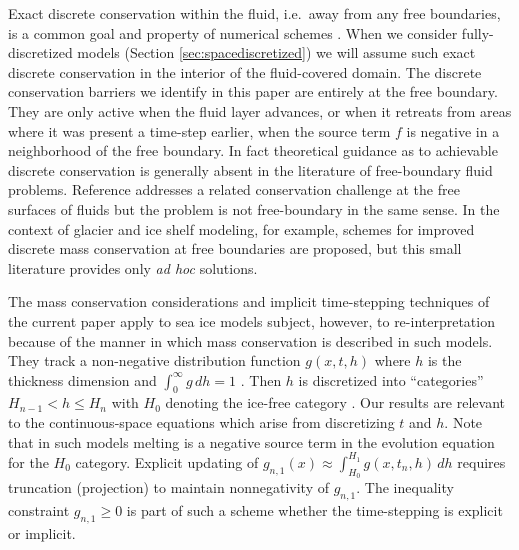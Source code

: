 \documentclass[final,onefignum]{siamart190516}
\begin{document}
Exact discrete conservation within the fluid, i.e.~away from any free boundaries, is a common goal and property of numerical schemes \cite[and references therein]{LeVeque2002}.  When we consider fully-discretized models (Section \ref{sec:spacediscretized}) we will assume such exact discrete conservation in the interior of the fluid-covered domain.  The discrete conservation barriers we identify in this paper are entirely at the free boundary.  They are only active when the fluid layer advances, or when it retreats from areas where it was present a time-step earlier, when the source term $f$ is negative in a neighborhood of the free boundary.  In fact theoretical guidance as to achievable discrete conservation is generally absent in the literature of free-boundary fluid problems.  Reference \cite{IdelsohnOnate2010} addresses a related conservation challenge at the free surfaces of fluids but the problem is not free-boundary in the same sense.  In the context of glacier \cite{JaroschSchoofAnslow2013} and ice shelf \cite{Albrechtetal2011} modeling, for example, schemes for improved discrete mass conservation at free boundaries are proposed, but this small literature provides only \emph{ad hoc} solutions.

The mass conservation considerations and implicit time-stepping techniques of the current paper apply to sea ice models subject, however, to re-interpretation because of the manner in which mass conservation is described in such models.  They track a non-negative distribution function $g(x,t,h)$ where $h$ is the thickness dimension and $\int_0^\infty g\,dh = 1$ \cite{Thorndikeetal1975}.  Then $h$ is discretized into ``categories'' $H_{n-1} < h \le H_n$ with $H_0$ denoting the ice-free category \cite{LipscombHunke2004}.  Our results are relevant to the continuous-space equations which arise from discretizing $t$ and $h$.  Note that in such models melting is a negative source term in the evolution equation for the $H_0$ category.  Explicit updating of $g_{n,1}(x) \approx \int_{H_0}^{H_1} g(x,t_n,h)\,dh$ requires truncation (projection) to maintain nonnegativity of $g_{n,1}$.  The inequality constraint $g_{n,1} \ge 0$ is part of such a scheme whether the time-stepping is explicit or implicit.
\end{document}
